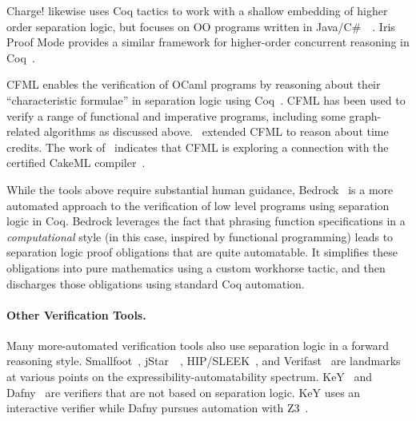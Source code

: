 Charge! likewise uses Coq tactics to work with a shallow embedding of higher 
order separation logic, but focuses on OO programs written in 
Java/C\#~~\cite{bengtson:charge}. Iris Proof Mode provides a similar framework 
for higher-order concurrent reasoning in Coq~\cite{krebbers:iris}.

CFML enables the verification of OCaml programs by reasoning about their
``characteristic formulae'' in separation logic using Coq~\cite{char10, char11}. 
CFML has been used to verify a range of functional and imperative programs,
including some graph-related algorithms as discussed 
above. \citet{charpott19}~extended CFML to reason about time 
credits. The work of \citet{gueneau17}~indicates that CFML is exploring a connection 
with the certified CakeML compiler~\cite{cakeml}.

While the tools above require substantial human guidance, 
Bedrock~\cite{chlipala:bedrock} is a more automated approach to the verification of 
low level programs using separation logic in Coq. 
Bedrock leverages the fact that phrasing function 
specifications in a \emph{computational} style 
(in this case, inspired by functional programming) 
leads to separation logic proof obligations that are quite automatable.
It simplifies these obligations into pure mathematics using a 
custom workhorse tactic, and then discharges those 
obligations using standard Coq automation.

\paragraph{Other Verification Tools.} 

Many more-automated verification tools also use separation logic in a forward
reasoning style. Smallfoot~\cite{berdine:smallfoot}, jStar~~\cite{distefanop08}, 
HIP/SLEEK~\cite{chin:hipsleek}, and Verifast~\cite{jacobs:verifast} are landmarks
at various points on the expressibility-automatability spectrum. 
KeY~\cite{beckert:2007} and Dafny~\cite{leino10} are verifiers that are not 
based on separation logic. KeY uses an interactive verifier while Dafny pursues
 automation with Z3~\cite{moura2008}.

